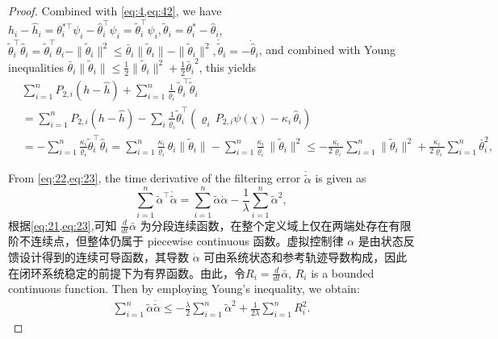 \documentclass[pdflatex,sn-mathphys-num]{sn-jnl}%
\theoremstyle{thmstyleone}%
\theoremstyle{thmstyletwo}%
\theoremstyle{thmstylethree}%
\begin{document}
\begin{proof}
Combined with \cref{eq:4,eq:42}, we have $h_i-\hat h_i=\theta_{i}^{*\top}\psi_i-\hat \theta_{i}^{\top}\psi_i    
=\tilde \theta_{i}^{\!\top}\psi_i, \tilde \theta_{i}=\theta_{i}^{*}-\hat \theta_{i}$, $\tilde \theta_{i}^\top\hat \theta_{i}   =\tilde \theta_{i}^\top \theta_{i}- \|\tilde \theta_{i}\|^2
\le \bar \theta_{i}\|\tilde \theta_{i}\| - \|\tilde \theta_{i}\|^2, \dot{\tilde \theta}_i=-\dot{\hat \theta}_i$, and combined with Young inequalities $\bar \theta_{i}\|\tilde \theta_{i}\| \le \frac12\|\tilde \theta_{i}\|^{2}
	+\frac12{\bar \theta_{i}}^{2}$, this yields
	\begin{equation}\label{eq:47}
		\begin{aligned}
				&\sum_{i=1}^n P_{2,i}(h-\hat{h})+\sum_{i=1}^{n}
					\frac{1}{\varrho_i}\,\tilde \theta_{i}^{\top}\dot{\tilde \theta}_i \\
					&= 
					\sum_{i=1}^n P_{2,i}(h-\hat{h}) -\sum_{i}
					\frac{1}{\varrho_i}\tilde \theta_{i}^{\top}
					\left(
						\varrho_i\,P_{2,i}\psi(\chi) - \kappa_i\,\hat{\theta}_i
					\right)                                                   \\
					 &= -\sum_{i=1}^{n}\frac{\kappa_i}{\varrho_i}\tilde \theta_{i}^{\top}\hat \theta_{i}        =\sum_{i=1}^n \frac{\kappa_i}{\varrho_i}\,\theta_{i}\|\tilde \theta_{i}\|
				- \sum_{i=1}^n \frac{\kappa_i}{\varrho_i}\,\|\tilde \theta_{i}\|^2 \le
				- \frac{\kappa_i}{2\varrho_i}\sum_{i=1}^n \|\tilde \theta_{i}\|^2+\frac{\kappa_i}{2\varrho_i}\sum_{i=1}^n \bar \theta_{i}^2,		
			\end{aligned}
		\end{equation}

From \cref{eq:22,eq:23}, the time derivative of the filtering error $\dot{\tilde{\alpha}}$ is given as
\begin{equation}\label{eq:48}
	\sum_{i=1}^{n}\tilde\alpha^\top \dot{\tilde \alpha}= \sum_{i=1}^{n}{\tilde{\alpha}}\dot{\alpha}-\frac{1}{\lambda}\sum_{i=1}^{n}{\tilde{\alpha}}^2,
\end{equation}
根据\cref{eq:21,eq:23},可知 $\frac{d}{dt} \bar{\alpha}$ 为分段连续函数，在整个定义域上仅在两端处存在有限阶不连续点，但整体仍属于 piecewise continuous 函数。虚拟控制律 $\alpha$ 是由状态反馈设计得到的连续可导函数，其导数 $\dot{\alpha}$ 可由系统状态和参考轨迹导数构成，因此在闭环系统稳定的前提下为有界函数。由此，令$R_i=\frac{d}{dt} \bar{\alpha}$, $R_i$ is a bounded continuous function.
Then by employing Young's inequality, we obtain:
\begin{equation}\label{eq:49}
	\begin{aligned}
		\sum_{i=1}^{n}{\tilde{\alpha}}\dot{\tilde{\alpha}}\leq -\frac{\lambda}{2} \sum_{i=1}^{n} {\tilde{\alpha}}^{2} + \frac{1}{2\lambda} \sum_{i=1}^{n}R_{i}^2. 
	\end{aligned}
\end{equation}






\end{proof}
\end{document}
